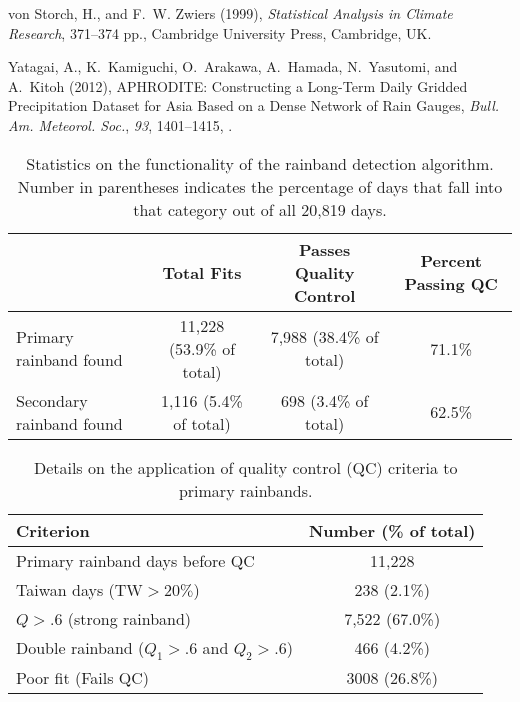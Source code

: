 \documentclass[draft,grl]{agutexSI}
\begin{document}
\begin{article}
\begin{thebibliography}{4}
von Storch, H., and F.~W. Zwiers (1999), \textit{{Statistical Analysis in
  Climate Research}}, 371--374 pp., Cambridge University Press, Cambridge, UK.

Yatagai, A., K.~Kamiguchi, O.~Arakawa, A.~Hamada, N.~Yasutomi, and A.~Kitoh
  (2012), {APHRODITE: Constructing a Long-Term Daily Gridded Precipitation
  Dataset for Asia Based on a Dense Network of Rain Gauges}, \textit{Bull. Am.
  Meteorol. Soc.}, \textit{93}, 1401--1415, .

\end{thebibliography}

\end{article}

\clearpage


\begin{table}

\caption{Statistics on the functionality of the rainband detection algorithm. Number in parentheses indicates the percentage of days that fall into that category out of all 20,819 days.}
\centering

\begin{tabular}{ l c c c}
	  & Total Fits & Passes Quality Control & Percent Passing QC\\
	 \hline
	 Primary rainband found & 11,228 (53.9\% of total) & 7,988 (38.4\% of total) & 71.1\% \\
	 Secondary rainband found & 1,116 (5.4\% of total) & 698 (3.4\% of total) & 62.5\% \\
\end{tabular}
\label{ts1}
\end{table}

\begin{table}

\caption{Details on the application of quality control (QC) criteria to primary rainbands.}
\centering

\begin{tabular}{ l c}
	 Criterion & Number (\% of total) \\
	 \hline
	 Primary rainband days before QC & 11,228 \\
	 Taiwan days (TW$>20\%$) & 238 (2.1\%) \\
	 $Q>.6$ (strong rainband) & 7,522 (67.0\%) \\
	 Double rainband ($Q_1>.6$ and $Q_2>.6$) & 466 (4.2\%) \\
	 Poor fit (Fails QC) & 3008 (26.8\%) \\
	 
\end{tabular}
\label{ts2}
\end{table}
\end{document}
